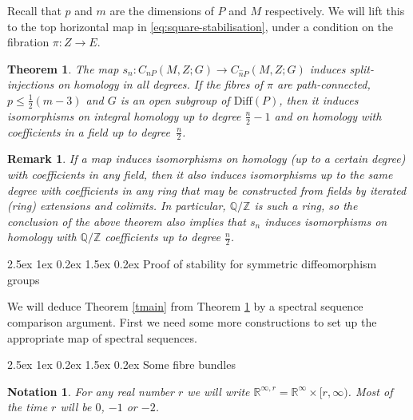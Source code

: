 \documentclass[reqno,a4paper]{article}
\makeatletter
\numberwithin{equation}{section}
\theoremstyle{italicised}
\newtheorem{athm}{Theorem}\renewcommand{\theathm}{\Alph{athm}}
\theoremstyle{upright}
\newtheorem{rmk}[thm]{Remark}
\newtheorem{notation}[thm]{Notation}
\theoremstyle{italicised-restate}
\renewcommand*{\section}{\@startsection{section}{1}{\z@}%
	{2.5ex \@plus 1ex \@minus 0.2ex}%
	{1.5ex \@plus 0.2ex}%
	{\normalfont\large\bfseries}}
\renewcommand*{\subsection}{\@startsection{subsection}{2}{\z@}%
	{2.5ex \@plus 1ex \@minus 0.2ex}%
	{1.5ex \@plus 0.2ex}%
	{\normalfont\normalsize\bfseries}}
\newcommand{\bQ}{\mathbb{Q}}
\newcommand{\bR}{\mathbb{R}}
\newcommand{\bZ}{\mathbb{Z}}
\renewcommand{\leq}{\leqslant}
\makeatother
\begin{document}
Recall that $p$ and $m$ are the dimensions of $P$ and $M$ respectively. We will lift this to the top horizontal map in \eqref{eq:square-stabilisation}, under a condition on the fibration $\pi \colon Z \to E$.

\begin{athm}\label{tlabelled}
The map $s_n \colon C_{nP}(M,Z;G) \to C_{\hat{n}P}(M,Z;G)$ induces split-injections on homology in all degrees. If the fibres of $\pi$ are path-connected, $p \leq \tfrac12(m-3)$ and $G$ is an open subgroup of $\mathrm{Diff}(P)$, then it induces isomorphisms on integral homology up to degree $\tfrac{n}{2} - 1$ and on homology with coefficients in a field up to degree~$\tfrac{n}{2}$.
\end{athm}

\begin{rmk}
If a map induces isomorphisms on homology (up to a certain degree) with coefficients in any field, then it also induces isomorphisms up to the same degree with coefficients in any ring that may be constructed from fields by iterated (ring) extensions and colimits. In particular, $\bQ/\bZ$ is such a ring, so the conclusion of the above theorem also implies that $s_n$ induces isomorphisms on homology with $\bQ/\bZ$ coefficients up to degree $\tfrac{n}{2}$.
\end{rmk}


\section{Proof of stability for symmetric diffeomorphism groups}\label{s:proof-symm-diff-groups}


We will deduce Theorem \ref{tmain} from Theorem \ref{tlabelled} by a spectral sequence comparison argument. First we need some more constructions to set up the appropriate map of spectral sequences.


\subsection{Some fibre bundles}


\begin{notation}
For any real number $r$ we will write $\bR^{\infty,r} = \bR^\infty \times [r,\infty)$. Most of the time $r$ will be $0$, $-1$ or $-2$.
\end{notation}
\end{document}
